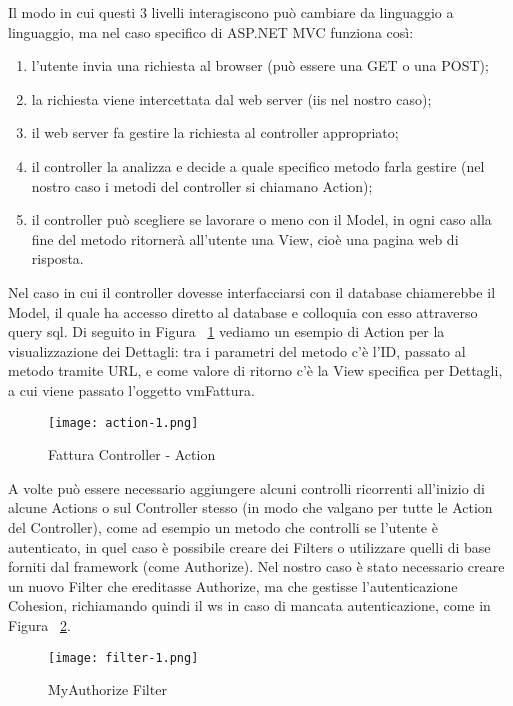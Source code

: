 Il modo in cui questi 3 livelli interagiscono può cambiare da linguaggio a linguaggio, ma nel caso specifico di ASP.NET MVC funziona così:
\begin{enumerate}
    \item l'utente invia una richiesta al browser (può essere una GET o una POST);
    \item la richiesta viene intercettata dal web server (\Gls{iis} nel nostro caso);
    \item il web server fa gestire la richiesta al controller appropriato;
    \item il controller la analizza e decide a quale specifico metodo farla gestire (nel nostro caso i metodi del controller si chiamano Action);
    \item il controller può scegliere se lavorare o meno con il Model, in ogni caso alla fine del metodo ritornerà all'utente una View, cioè una pagina web di risposta.
\end{enumerate}
Nel caso in cui il controller dovesse interfacciarsi con il database chiamerebbe il Model, il quale ha accesso diretto al database e colloquia con esso attraverso query \Gls{sql}.
Di seguito in Figura ~\ref{fig:Action1} vediamo un esempio di Action per la visualizzazione dei Dettagli: tra i parametri del metodo c'è l'ID, passato al metodo tramite URL, e come valore di ritorno c'è la View specifica per Dettagli, a cui viene passato l'oggetto vmFattura.

\begin{figure}[H]
    \centering
    \texttt{[image: action-1.png]}
    \caption{Fattura Controller - Action }
    \label{fig:Action1}
\end{figure}

A volte può essere necessario aggiungere alcuni controlli ricorrenti all'inizio di alcune Actions o sul Controller stesso (in modo che valgano per tutte le Action del Controller), come ad esempio un metodo che controlli se l'utente è autenticato, in quel caso è possibile creare dei Filters o utilizzare quelli di base forniti dal framework (come Authorize).
Nel nostro caso è stato necessario creare un nuovo Filter che ereditasse Authorize, ma che gestisse l'autenticazione Cohesion, richiamando quindi il \Gls{ws} in caso di mancata autenticazione, come in Figura ~\ref{fig:Filter1}.

\begin{figure}[H]
    \centering
    \texttt{[image: filter-1.png]}
    \caption{MyAuthorize Filter}
    \label{fig:Filter1}
\end{figure}

